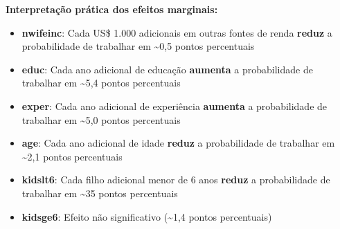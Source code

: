 \documentclass[
  letterpaper,
  DIV=11,
  numbers=noendperiod]{scrartcl}
\providecommand{\tightlist}{%
  \setlength{\itemsep}{0pt}\setlength{\parskip}{0pt}}\usepackage{longtable,booktabs,array}
\begin{document}
\textbf{Interpretação prática dos efeitos marginais:}

\begin{itemize}
\tightlist
\item
  \textbf{nwifeinc}: Cada US\$ 1.000 adicionais em outras fontes de
  renda \textbf{reduz} a probabilidade de trabalhar em
  \textasciitilde0,5 pontos percentuais
\item
  \textbf{educ}: Cada ano adicional de educação \textbf{aumenta} a
  probabilidade de trabalhar em \textasciitilde5,4 pontos percentuais
\item
  \textbf{exper}: Cada ano adicional de experiência \textbf{aumenta} a
  probabilidade de trabalhar em \textasciitilde5,0 pontos percentuais
\item
  \textbf{age}: Cada ano adicional de idade \textbf{reduz} a
  probabilidade de trabalhar em \textasciitilde2,1 pontos percentuais
\item
  \textbf{kidslt6}: Cada filho adicional menor de 6 anos \textbf{reduz}
  a probabilidade de trabalhar em \textasciitilde35 pontos percentuais
\item
  \textbf{kidsge6}: Efeito não significativo (\textasciitilde1,4 pontos
  percentuais)
\end{itemize}
\end{document}
